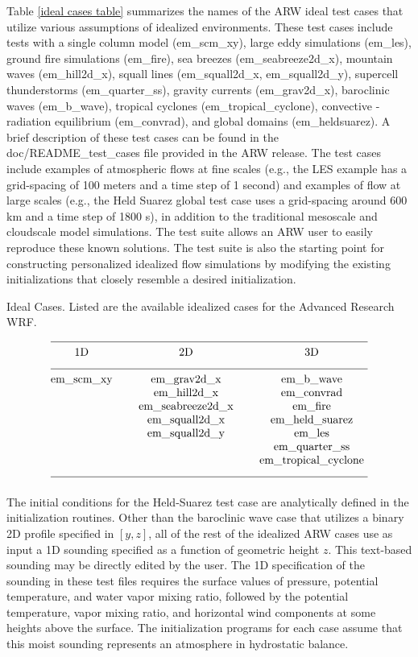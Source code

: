 Table \ref {ideal cases table} summarizes the names of the ARW ideal test cases that
utilize various assumptions of idealized environments.
These test cases include
tests with a single column model (em\_scm\_xy), 
large eddy simulations (em\_les), ground fire simulations (em\_fire),
sea breezes (em\_seabreeze2d\_x), mountain waves (em\_hill2d\_x), squall lines
(em\_squall2d\_x, em\_squall2d\_y), supercell thunderstorms
(em\_quarter\_ss), gravity currents (em\_grav2d\_x), baroclinic
waves (em\_b\_wave), tropical cyclones (em\_tropical\_cyclone), 
convective - radiation equilibrium (em\_convrad), and 
global domains (em\_heldsuarez).  
A brief description of these test cases can be
found in the doc/README\_test\_cases file provided in the ARW release.
The test cases include examples of atmospheric
flows at fine scales (e.g., the LES example has a grid-spacing of
100 meters and a time step of 1 second) and examples of flow at large
scales (e.g., the Held Suarez global test case uses a grid-spacing around 600 km and
a time step of 1800 s), in addition to the traditional mesoscale and
cloudscale model simulations.  The test suite allows an ARW user to
easily reproduce these known solutions.  The test suite is also the
starting point for constructing personalized idealized flow simulations by modifying
the existing initializations that closely resemble a desired initialization.

\begin{table}
\caption{Ideal Cases. Listed are the available idealized cases for the Advanced Research WRF.}
\label{ideal cases table}
$$\vbox
{\halign{\hfil#\hfil \qquad & \hfil#\hfil \qquad & \hfil#\hfil \cr
\multispan3\hrulefill \cr
 1D             & 2D                  & 3D                    \cr
\multispan3\hrulefill \cr
em\_scm\_xy     &  em\_grav2d\_x      & em\_b\_wave           \cr
                &  em\_hill2d\_x      & em\_convrad           \cr
                &  em\_seabreeze2d\_x & em\_fire              \cr
                &  em\_squall2d\_x    & em\_held\_suarez      \cr
                &  em\_squall2d\_y    & em\_les               \cr
                &                     & em\_quarter\_ss       \cr
                &                     & em\_tropical\_cyclone \cr
\multispan3\hrulefill \cr
}}$$
\end{table}

The initial conditions for the Held-Suarez test case are analytically
defined in the initialization routines. Other than the baroclinic wave case
that utilizes a binary 2D profile specified in $[y,z]$, all of the rest of the
idealized ARW cases use as input a 1D sounding specified as a function of
geometric height $z$. This text-based sounding may be
directly edited by the user.  
The 1D specification of the sounding in
these test files requires the surface values of pressure, potential
temperature, and water vapor mixing ratio, followed by the potential
temperature, vapor mixing ratio, and horizontal wind components at some
heights above the surface.  The initialization programs for each case
assume that this moist sounding represents an atmosphere in hydrostatic
balance.

